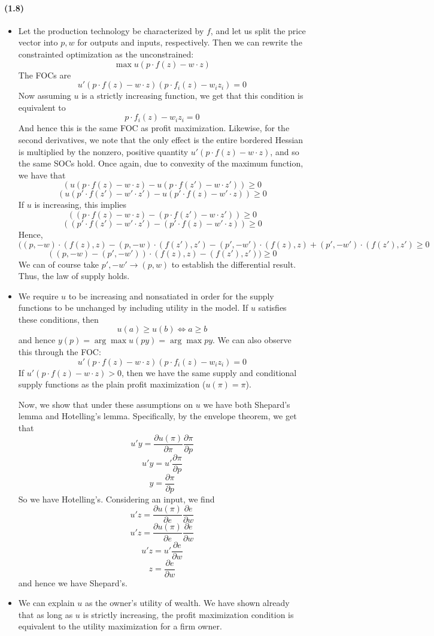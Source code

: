 \documentclass[10pt,letter]{article}
\begin{document}
\paragraph{(1.8)}
\begin{itemize}
\item Let the production technology be characterized by $f$, and let us split the price vector into $p, w$ for outputs and inputs, respectively. Then we can rewrite the constrainted optimization as the unconstrained:
\[ \max u(p \cdot f(z) - w\cdot z) \]
The FOCs are
\[ u'(p\cdot f(z) - w\cdot z)(p\cdot f_i(z) - w_iz_i) = 0 \]
Now assuming $u$ is a strictly increasing function, we get that this condition is equivalent to
\[p\cdot f_i(z) - w_iz_i = 0 \]
And hence this is the same FOC as profit maximization. Likewise, for the second derivatives, we note that the only effect is the entire bordered Hessian is multiplied by the nonzero, positive quantity $u'(p\cdot f(z) - w\cdot z)$, and so the same SOCs hold. Once again, due to convexity of the maximum function, we have that
\[ (u(p \cdot f(z) - w \cdot z) - u(p \cdot f(z') - w \cdot z')) \ge 0 \]
\[ (u(p' \cdot f(z') - w' \cdot z') - u(p' \cdot f(z) - w' \cdot z)) \ge 0 \]
If $u$ is increasing, this implies
\[ ((p \cdot f(z) - w \cdot z) - (p \cdot f(z') - w \cdot z')) \ge 0 \]
\[ ((p' \cdot f(z') - w' \cdot z') - (p' \cdot f(z) - w' \cdot z)) \ge 0 \]
Hence,
\[ ((p, -w) \cdot (f(z), z) - (p, -w) \cdot (f(z'), z') - (p', -w') \cdot (f(z), z) + (p', -w') \cdot (f(z'), z') \ge 0 \]
\[ ((p, -w) - (p', -w')) \cdot (f(z), z) - (f(z'), z')) \ge 0 \]
We can of course take $p', -w' \to (p,w)$ to establish the differential result. Thus, the law of supply holds.
\item We require $u$ to be increasing and nonsatiated in order for the supply functions to be unchanged by including utility in the model. If $u$ satisfies these conditions, then
\[ u(a) \ge u(b) \iff a \ge b \]
and hence $y(p) = \arg \max u(p y) = \arg \max py $. We can also observe this through the FOC:
\[ u'(p\cdot f(z) - w\cdot z)(p\cdot f_i(z) - w_iz_i) = 0 \]
If $u'(p\cdot f(z) - w\cdot z) > 0$, then we have the same supply and conditional supply functions as the plain profit maximization ($u(\pi) = \pi$).

Now, we show that under these assumptions on $u$ we have both Shepard's lemma and Hotelling's lemma. Specifically, by the envelope theorem, we get that
\[ u'y = \frac{\partial u(\pi)}{\partial \pi} \frac{\partial \pi}{\partial p}  \]
\[ u'y =  u' \frac{\partial \pi}{\partial p}\]
\[ y = \frac{\partial \pi}{\partial p} \]
So we have Hotelling's. Considering an input, we find
\[ u'z = \frac{\partial u(\pi)}{\partial e} \frac{\partial e}{\partial w}  \]
\[ u'z = \frac{\partial u(\pi)}{\partial e} \frac{\partial e}{\partial w}  \]
\[ u'z = u' \frac{\partial e}{\partial w}  \]
\[ z = \frac{\partial e}{\partial w}  \]
and hence we have Shepard's.


\item We can explain $u$ as the owner's utility of wealth. We have shown already that as long as $u$ is strictly increasing, the profit maximization condition is equivalent to the utility maximization for a firm owner.
\end{itemize}
\pagebreak
\end{document}
